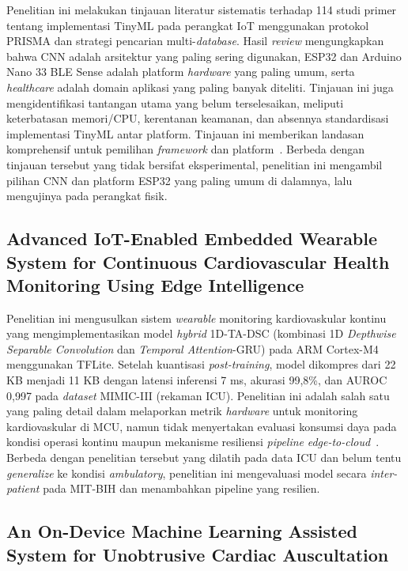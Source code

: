 Penelitian ini melakukan tinjauan literatur sistematis terhadap 114 studi primer tentang implementasi TinyML pada perangkat IoT menggunakan protokol PRISMA dan strategi pencarian multi-\textit{database}. Hasil \textit{review} mengungkapkan bahwa CNN adalah arsitektur yang paling sering digunakan, ESP32 dan Arduino Nano 33 BLE Sense adalah platform \textit{hardware} yang paling umum, serta \textit{healthcare} adalah domain aplikasi yang paling banyak diteliti. Tinjauan ini juga mengidentifikasi tantangan utama yang belum terselesaikan, meliputi keterbatasan memori/CPU, kerentanan keamanan, dan absennya standardisasi implementasi TinyML antar platform. Tinjauan ini memberikan landasan komprehensif untuk pemilihan \textit{framework} dan platform~\cite{tinyml_iot_review}. Berbeda dengan tinjauan tersebut yang tidak bersifat eksperimental, penelitian ini mengambil pilihan CNN dan platform ESP32 yang paling umum di dalamnya, lalu mengujinya pada perangkat fisik.

\subsection{Advanced IoT-Enabled Embedded Wearable System for Continuous Cardiovascular Health Monitoring Using Edge Intelligence}
\label{subsec:related-sheebarani2026}

Penelitian ini mengusulkan sistem \textit{wearable} monitoring kardiovaskular kontinu yang mengimplementasikan model \textit{hybrid} 1D-TA-DSC (kombinasi 1D \textit{Depthwise Separable Convolution} dan \textit{Temporal Attention}-GRU) pada ARM Cortex-M4 menggunakan TFLite. Setelah kuantisasi \textit{post-training}, model dikompres dari 22 KB menjadi 11 KB dengan latensi inferensi 7 ms, akurasi 99,8\%, dan AUROC 0,997 pada \textit{dataset} MIMIC-III (rekaman ICU). Penelitian ini adalah salah satu yang paling detail dalam melaporkan metrik \textit{hardware} untuk monitoring kardiovaskular di MCU, namun tidak menyertakan evaluasi konsumsi daya pada kondisi operasi kontinu maupun mekanisme resiliensi \textit{pipeline} \textit{edge-to-cloud}~\cite{sheeba_rani_2026}. Berbeda dengan penelitian tersebut yang dilatih pada data ICU dan belum tentu \textit{generalize} ke kondisi \textit{ambulatory}, penelitian ini mengevaluasi model secara \textit{inter-patient} pada MIT-BIH dan menambahkan pipeline yang resilien.

\subsection{An On-Device Machine Learning Assisted System for Unobtrusive Cardiac Auscultation}
\label{subsec:related-chowdhury2023}


